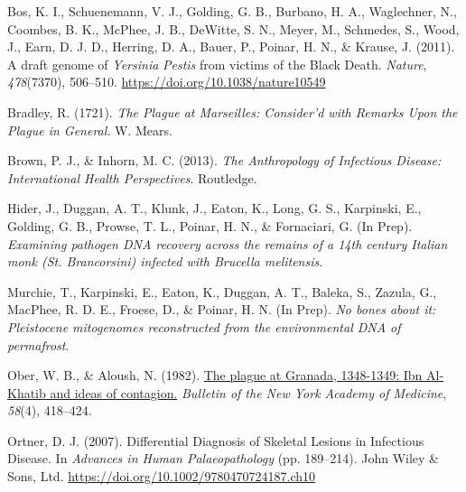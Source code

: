 \documentclass[
]{report}
\newlength{\cslhangindent}
\newenvironment{CSLReferences}[2] %
  {%
  \setlength{\parindent}{0pt}
  \ifodd #1 \everypar{\setlength{\hangindent}{\cslhangindent}}\ignorespaces\fi
  \ifnum #2 > 0
  \setlength{\parskip}{#2\baselineskip}
  \fi
}%
{}
\begin{document}
\hypertarget{refs}{}
\begin{CSLReferences}{1}{0}
\leavevmode{}%
Bos, K. I., Schuenemann, V. J., Golding, G. B., Burbano, H. A.,
Waglechner, N., Coombes, B. K., McPhee, J. B., DeWitte, S. N., Meyer,
M., Schmedes, S., Wood, J., Earn, D. J. D., Herring, D. A., Bauer, P.,
Poinar, H. N., \& Krause, J. (2011). A draft genome of
{\emph{Yersinia}}{ \emph{Pestis}} from victims of the {Black Death}.
\emph{Nature}, \emph{478}(7370), 506--510.
\url{https://doi.org/10.1038/nature10549}

\leavevmode{}%
Bradley, R. (1721). \emph{The {Plague} at {Marseilles}: {Consider}'d
with {Remarks Upon} the {Plague} in {General}}. {W. Mears}.

\leavevmode{}%
Brown, P. J., \& Inhorn, M. C. (2013). \emph{The {Anthropology} of
{Infectious Disease}: {International Health Perspectives}}. {Routledge}.

\leavevmode{}%
Hider, J., Duggan, A. T., Klunk, J., Eaton, K., Long, G. S., Karpinski,
E., Golding, G. B., Prowse, T. L., Poinar, H. N., \& Fornaciari, G. (In
Prep). \emph{Examining pathogen {DNA} recovery across the remains of a
14th century {Italian} monk ({St}. {Brancorsini}) infected with
{Brucella} melitensis}.

\leavevmode{}%
Murchie, T., Karpinski, E., Eaton, K., Duggan, A. T., Baleka, S.,
Zazula, G., MacPhee, R. D. E., Froese, D., \& Poinar, H. N. (In Prep).
\emph{No bones about it: {Pleistocene} mitogenomes reconstructed from
the environmental {DNA} of permafrost}.

\leavevmode{}%
Ober, W. B., \& Aloush, N. (1982).
\href{https://www.ncbi.nlm.nih.gov/pmc/articles/PMC1808550}{The plague
at {Granada}, 1348-1349: {Ibn Al-Khatib} and ideas of contagion.}
\emph{Bulletin of the New York Academy of Medicine}, \emph{58}(4),
418--424.

\leavevmode{}%
Ortner, D. J. (2007). Differential {Diagnosis} of {Skeletal Lesions} in
{Infectious Disease}. In \emph{Advances in {Human Palaeopathology}} (pp.
189--214). {John Wiley \& Sons, Ltd}.
\url{https://doi.org/10.1002/9780470724187.ch10}


\end{CSLReferences}
\end{document}
